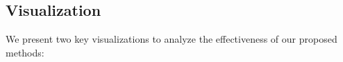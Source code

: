 






\subsection{Visualization}
We present two key visualizations to analyze the effectiveness of our proposed methods:
